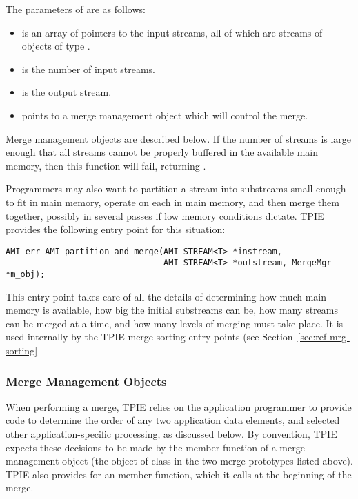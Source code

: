 The parameters of  are as follows:
\begin{itemize}
    \item {} is an array of pointers to the
    input streams, all of which are streams of objects of
    type .
    \item {} is the number of input streams.
    \item {} is the output stream.
    \item {} points to a merge management
    object which will control the merge.
\end{itemize}

Merge management objects are described below. If the number of
streams is large enough that all streams cannot be properly buffered in the
available main memory, then this function will fail, returning
.

Programmers may also want to partition a stream into
substreams small enough to fit in main memory, operate on
each in main memory, and then merge them together, possibly
in several passes if low memory conditions dictate. TPIE
provides the following entry point for this situation:
\begin{verbatim}
AMI_err AMI_partition_and_merge(AMI_STREAM<T> *instream,
                                AMI_STREAM<T> *outstream, MergeMgr *m_obj);
\end{verbatim}
This entry point takes care of all the details of determining how much
main memory is available, how big the initial substreams can be, how
many streams can be merged at a time, and how many levels of merging
must take place. It is used internally by the TPIE merge
sorting entry points (see Section~\ref{sec:ref-mrg-sorting}

\subsubsection{Merge Management Objects}

When performing a merge, TPIE relies on the application
programmer to provide code to determine the order of any two
application data elements, and selected other
application-specific processing, as discussed below. By
convention, TPIE expects these decisions to be made by the
 member function of a merge management
object (the object of class  in the two
merge prototypes listed above). TPIE also provides for an
 member function, which it calls at the
beginning of the merge.

